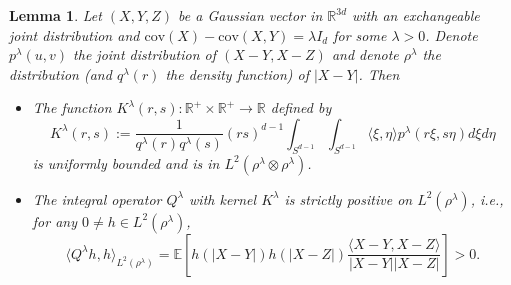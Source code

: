 \documentclass[]{elsarticle}
\def\R{\mathbb{R}}
\def\E{\mathbb{E}}
\def\lambdaG{\lambda}
\newcommand{\cov}{\mathrm{cov}}
\newcommand{\innerp}[2]{\langle #1,#2 \rangle}
\newcommand{\FL}[1]{\textcolor{blue}{{#1}}}
\newtheorem{lemma}[theorem]{Lemma}
\numberwithin{equation}{section}
\numberwithin{theorem}{section}
\begin{document}
\begin{lemma}\label{SP_Gaussian}
Let $(X, Y, Z)$ be a Gaussian vector in $ \R^{3d}$ with an exchangeable  joint distribution and $\cov(X)-\cov(X,Y) =\lambdaG I_d$ for some $\lambdaG>0$. Denote $ p^\lambdaG(u,v)$ the joint distribution of $(X-Y, X-Z)$ and denote $\rho^\lambdaG$ the distribution (and $q^\lambdaG(r)$ the density function) of $|X-Y|$. 
 Then
 \begin{itemize}
  \item[(i)] The function $K^\lambdaG(r,s):\R^+\times \R^+\to\R$ defined by 
  \begin{equation} \label{kernelK_gauss}
K^\lambdaG(r,s) := \frac{1}{q^\lambdaG(r)q^\lambdaG(s)} (rs)^{d-1}\int_{S^{d-1}}\int_{S^{d-1}}\innerp{\xi}{\eta} p^\lambdaG(r\xi,s\eta) d\xi d\eta 
 \end{equation}
 is  uniformly bounded and is in $L^2(\rho^\lambdaG\otimes\rho^\lambdaG)$.  
\item[(ii)] The integral operator $Q^\lambdaG$ with kernel $K^\lambdaG $ is strictly positive on $L^2(\rho^\lambdaG)$, i.e., for any $0\neq h\in L^2(\rho^\lambdaG)$, 
\begin{equation}  \label{eq:Q_expSPD}
\langle Q^\lambdaG h, h\rangle_{L^2(\rho^\lambdaG)} =   \E\left[h(|X-Y|)h(|X-Z|)\frac{\langle X-Y,X-Z\rangle}{|X-Y||X-Z|}\right] >0. 
\end{equation}
 \end{itemize}
\end{lemma}
\end{document}
